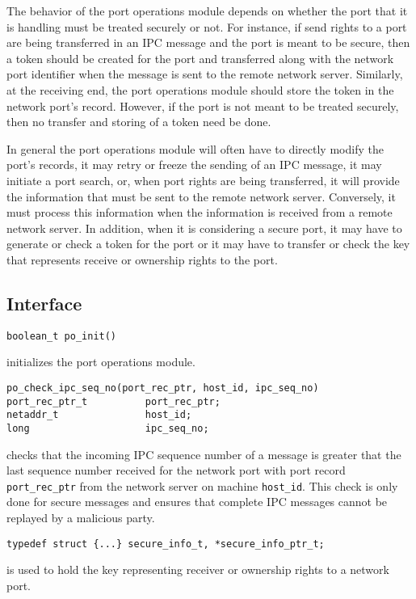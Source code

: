 The behavior of the port operations module depends on whether the port that
it is handling must be treated securely or not.  For instance, if send
rights to a port are being transferred in an IPC message and the port is
meant to be secure, then a token should be created for the port and
transferred along with the network port identifier when the message is sent
to the remote network server.  Similarly, at the receiving end, the port
operations module should store the token in the network port's record.
However, if the port is not meant to be treated securely, then no transfer
and storing of a token need be done.

In general the port operations module will often have to directly modify the
port's records, it may retry or freeze the sending of an IPC message, it may
initiate a port search, or, when port rights are being transferred, it will
provide the information that must be sent to the remote network server.
Conversely, it must process this information when the information is
received from a remote network server.  In addition, when it is considering
a secure port, it may have to generate or check a token for the port or it
may have to transfer or check the key that represents receive or ownership
rights to the port.

\subsection{Interface}
\begin{verbatim}
boolean_t po_init()
\end{verbatim}
initializes the port operations module.

\begin{verbatim}
po_check_ipc_seq_no(port_rec_ptr, host_id, ipc_seq_no)
port_rec_ptr_t          port_rec_ptr;
netaddr_t               host_id;
long                    ipc_seq_no;
\end{verbatim}
checks that the incoming IPC sequence number of a message is greater that
the last sequence number received for the network port with port record
\verb"port_rec_ptr" from the network server on machine \verb"host_id".  This
check is only done for secure messages and ensures that complete IPC
messages cannot be replayed by a malicious party.

\begin{verbatim}
typedef struct {...} secure_info_t, *secure_info_ptr_t;
\end{verbatim}
is used to hold the key representing receiver or ownership rights to a
network port.

